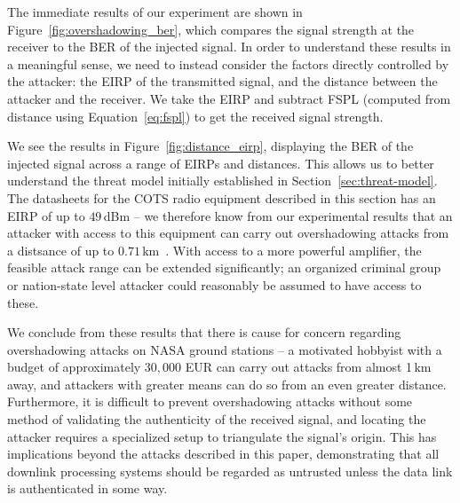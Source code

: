 The immediate results of our experiment are shown in Figure~\ref{fig:overshadowing_ber}, which compares the signal strength at the receiver to the BER of the injected signal.
In order to understand these results in a meaningful sense, we need to instead consider the factors directly controlled by the attacker: the EIRP of the transmitted signal, and the distance between the attacker and the receiver.
We take the EIRP and subtract FSPL (computed from distance using Equation~\ref{eq:fspl}) to get the received signal strength.

We see the results in Figure~\ref{fig:distance_eirp}, displaying the BER of the injected signal across a range of EIRPs and distances.
This allows us to better understand the threat model initially established in Section~\ref{sec:threat-model}.
The datasheets for the COTS radio equipment described in this section has an EIRP of up to $49$\,dBm -- we therefore know from our experimental results that an attacker with access to this equipment can carry out overshadowing attacks from a distsance of up to $0.71$\,km~\cite{endurosat:xbandtransmitter,endurosat:xbandantenna}.
With access to a more powerful amplifier, the feasible attack range can be extended significantly; an organized criminal group or nation-state level attacker could reasonably be assumed to have access to these.

We conclude from these results that there is cause for concern regarding overshadowing attacks on NASA ground stations -- a motivated hobbyist with a budget of approximately $30,000$ EUR can carry out attacks from almost 1\,km away, and attackers with greater means can do so from an even greater distance.
Furthermore, it is difficult to prevent overshadowing attacks without some method of validating the authenticity of the received signal, and locating the attacker requires a specialized setup to triangulate the signal's origin.
This has implications beyond the attacks described in this paper, demonstrating that all downlink processing systems should be regarded as untrusted unless the data link is authenticated in some way.